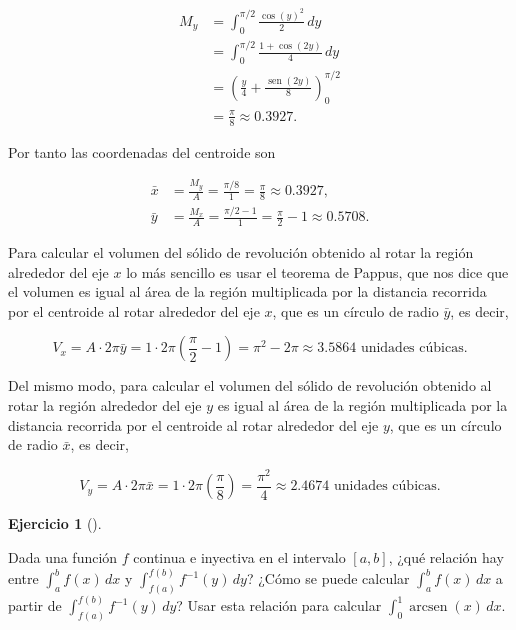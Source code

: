 \documentclass[
  spanish,
  a4paper,
]{scrreport}
\theoremstyle{definition}
\newtheorem{exercise}{Ejercicio}[chapter]
\theoremstyle{remark}
\begin{document}
\begin{tcolorbox}
\begin{align*}
M_y &= \int_0^{\pi/2} \frac{\cos(y)^2}{2} \, dy \\
&= \int_0^{\pi/2} \frac{1 + \cos(2y)}{4} \, dy \\
&= \left(\frac{y}{4} + \frac{\operatorname{sen}(2y)}{8}\right)_0^{\pi/2} \\
&= \frac{\pi}{8}
\approx 0.3927.
\end{align*}

Por tanto las coordenadas del centroide son

\begin{align*}
\bar{x} &= \frac{M_y}{A} = \frac{\pi/8}{1} = \frac{\pi}{8} \approx 0.3927, \\
\bar{y} &= \frac{M_x}{A} = \frac{\pi/2 - 1}{1} = \frac{\pi}{2} - 1 \approx 0.5708.
\end{align*}

Para calcular el volumen del sólido de revolución obtenido al rotar la
región alrededor del eje \(x\) lo más sencillo es usar el teorema de
Pappus, que nos dice que el volumen es igual al área de la región
multiplicada por la distancia recorrida por el centroide al rotar
alrededor del eje \(x\), que es un círculo de radio \(\bar{y}\), es
decir,

\[
V_x = A \cdot 2\pi \bar{y} = 1 \cdot 2\pi \left(\frac{\pi}{2} - 1\right) = \pi^2 - 2\pi \approx 3.5864 \mbox{ unidades cúbicas}.
\]

Del mismo modo, para calcular el volumen del sólido de revolución
obtenido al rotar la región alrededor del eje \(y\) es igual al área de
la región multiplicada por la distancia recorrida por el centroide al
rotar alrededor del eje \(y\), que es un círculo de radio \(\bar{x}\),
es decir,

\[
V_y = A \cdot 2\pi \bar{x} = 1 \cdot 2\pi \left(\frac{\pi}{8}\right) = \frac{\pi^2}{4} \approx 2.4674 \mbox{ unidades cúbicas}.
\]

\end{tcolorbox}

\begin{exercise}[]\protect\hypertarget{exr-4}{}\label{exr-4}

Dada una función \(f\) continua e inyectiva en el intervalo \([a,b]\),
¿qué relación hay entre \(\int_a^b f(x) \, dx\) y
\(\int_{f(a)}^{f(b)} f^{-1}(y) \, dy\)? ¿Cómo se puede calcular
\(\int_a^b f(x) \, dx\) a partir de
\(\int_{f(a)}^{f(b)} f^{-1}(y) \, dy\)? Usar esta relación para calcular
\(\int_{0}^1 \operatorname{arcsen}(x) \, dx\).

\end{exercise}
\end{document}
